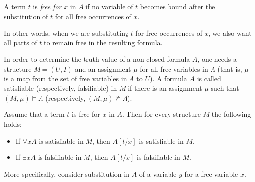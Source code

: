 \begin{page}
\setcounter{section}{2}
\setcounter{subsection}{1}
\setcounter{dfn}{1}
\label{portion:538}

\begin{dfn}
A term $t$ is \emph{free for} $x$ in $A$ if no variable of $t$ becomes bound after the substitution of $t$ for all free occurrences of $x$.
\end{dfn}

\end{page}

\begin{page}
\setcounter{section}{2}
\setcounter{subsection}{1}
\setcounter{dfn}{1}
\label{portion:539}

In other words, when we are substituting $t$ for free occurrences of $x$,
we also want all parts of $t$ to remain free in the resulting formula.

In order to determine the truth value of a non-closed formula $A$, one needs a structure $M = (U,I)$
and an assignment $\mu$ for all free variables in $A$ (that is, $\mu$ is a map from the set of free variables in $A$ to $U$).
A formula $A$ is called satisfiable (respectively, falsifiable) in $M$
if there is an assignment $\mu$ such that $(M, \mu) \vDash A$ (respectively, $(M, \mu) \not\vDash A$).


\end{page}

\begin{page}
\setcounter{section}{2}
\setcounter{subsection}{1}
\setcounter{dfn}{2}
\label{portion:541}

\begin{lem}
\label{lem:TermSubstitute}
Assume that a term $t$ is free for $x$ in $A$.
Then for every structure $M$ the following holds:
\begin{itemize}
\item
If $\forall x A$ is satisfiable in $M$, then $A[t/x]$ is satisfiable in $M$.
\item
If $\exists x A$ is falsifiable in $M$, then $A[t/x]$ is falsifiable in $M$.
\end{itemize}
\end{lem}

\end{page}

\begin{page}
\setcounter{section}{2}
\setcounter{subsection}{1}
\setcounter{dfn}{2}
\label{portion:542}


More specifically, consider substitution in $A$ of a variable $y$ for a free variable $x$.


\end{page}

